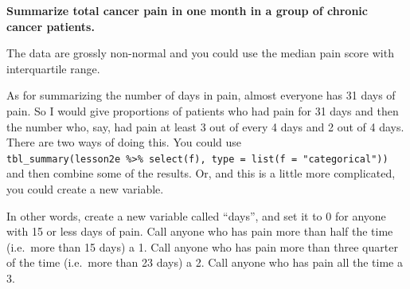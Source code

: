 \documentclass[]{book}
\newenvironment{Shaded}{\begin{snugshade}}{\end{snugshade}}
\newcommand{\DataTypeTok}[1]{\textcolor[rgb]{0.13,0.29,0.53}{#1}}
\newcommand{\DecValTok}[1]{\textcolor[rgb]{0.00,0.00,0.81}{#1}}
\newcommand{\KeywordTok}[1]{\textcolor[rgb]{0.13,0.29,0.53}{\textbf{#1}}}
\newcommand{\NormalTok}[1]{#1}
\newcommand{\OperatorTok}[1]{\textcolor[rgb]{0.81,0.36,0.00}{\textbf{#1}}}
\newcommand{\StringTok}[1]{\textcolor[rgb]{0.31,0.60,0.02}{#1}}
\begin{document}
\textbf{Summarize total cancer pain in one month in a group of chronic cancer patients.}

The data are grossly non-normal and you could use the median pain score with interquartile range.

As for summarizing the number of days in pain, almost everyone has 31 days of pain. So I would give proportions of patients who had pain for 31 days and then the number who, say, had pain at least 3 out of every 4 days and 2 out of 4 days. There are two ways of doing this. You could use \texttt{tbl\_summary(lesson2e\ \%\textgreater{}\%\ select(f),\ type\ =\ list(f\ =\ "categorical"))} and then combine some of the results. Or, and this is a little more complicated, you could create a new variable.

\begin{Shaded}
\end{Shaded}

In other words, create a new variable called ``days'', and set it to 0 for anyone with 15 or less days of pain. Call anyone who has pain more than half the time (i.e.~more than 15 days) a 1. Call anyone who has pain more than three quarter of the time (i.e.~more than 23 days) a 2. Call anyone who has pain all the time a 3.

\begin{Shaded}
\end{Shaded}
\end{document}
